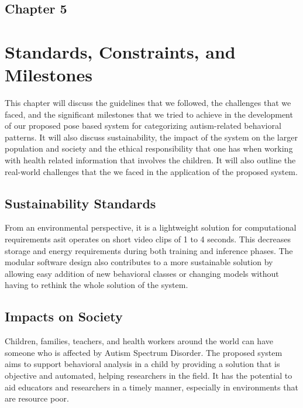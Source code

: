 
\begin{center}
    \section*{\fontsize{20}{20}\selectfont Chapter 5}
\end{center}
\vspace{10mm}

\section{Standards, Constraints, and Milestones}

This chapter will discuss the guidelines that we followed, the challenges that we faced, and the significant milestones that we tried to achieve in the development of our proposed pose based system for categorizing autism-related behavioral patterns. It will also discuss sustainability, the impact of the system on the larger population and society and the ethical responsibility that one has when working with health related information that involves the children. It will also outline the real-world challenges that the we faced in the application of the proposed system.

\subsection{Sustainability Standards}

From an environmental perspective, it is a lightweight solution for computational requirements asit operates on short video clips of 1 to 4 seconds. This decreases storage and energy requirements during both training and inference phases. The modular software design also contributes to a more sustainable solution by allowing easy addition of new behavioral classes or changing models without having to rethink the whole solution of the system.

\subsection{Impacts on Society}

Children, families, teachers, and health workers around the world can have someone who is affected by Autism Spectrum Disorder. The proposed system aims to support behavioral analysis in a child by providing a solution that is objective and automated, helping researchers in the field. It has the potential to aid educators and researchers in a timely manner, especially in environments that are resource poor.

